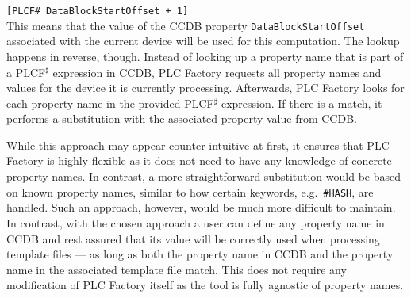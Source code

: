 \documentclass[a4paper,
              ]{jacow}
\begin{document}
\texttt{[PLCF\# DataBlockStartOffset + 1]} \\

This means that the value of the CCDB property \texttt{DataBlockStartOffset} associated with the current device will be used for this computation. The lookup happens in reverse, though. Instead of looking up a property name that is part of a PLCF$^\sharp$ expression in CCDB, PLC Factory requests all property names and values for the device it is currently processing. Afterwards, PLC Factory looks for each property name in the provided PLCF$^\sharp$ expression. If there is a match, it performs a substitution with the associated property value from CCDB.

While this approach may appear counter-intuitive at first, it ensures that PLC Factory is highly flexible as it does not need to have any knowledge of concrete property names. In contrast, a more straightforward substitution would be based on known property names, similar to how certain keywords, e.g.\ \texttt{\#HASH}, are handled. Such an approach, however, would be much more difficult to maintain. In contrast, with the chosen approach a user can define any property name in CCDB and rest assured that its value will be correctly used when processing template files --- as long as both the property name in CCDB and the property name in the associated template file match. This does not require any modification of PLC Factory itself as the tool is fully agnostic of property names.

%
%    
%    
%    
\end{document}
